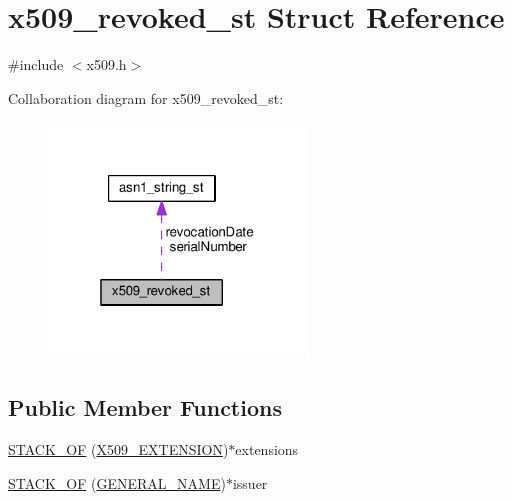 \hypertarget{structx509__revoked__st}{}\section{x509\+\_\+revoked\+\_\+st Struct Reference}
\label{structx509__revoked__st}


{\ttfamily \#include $<$x509.\+h$>$}



Collaboration diagram for x509\+\_\+revoked\+\_\+st\+:
\nopagebreak
\begin{figure}[H]
\begin{center}
\leavevmode
\includegraphics[width=196pt]{structx509__revoked__st__coll__graph}
\end{center}
\end{figure}
\subsection*{Public Member Functions}
\begin{DoxyCompactItemize}
\item 
\hyperlink{structx509__revoked__st_a7cda2324e28fdee169925d43cf9c4987}{S\+T\+A\+C\+K\+\_\+\+OF} (\hyperlink{x509_8h_ab2f7f7dc0ced8684e0cbfc818e408304}{X509\+\_\+\+E\+X\+T\+E\+N\+S\+I\+ON})$\ast$extensions
\item 
\hyperlink{structx509__revoked__st_a3bbf3ac238d169cff492184f23d0c182}{S\+T\+A\+C\+K\+\_\+\+OF} (\hyperlink{x509v3_8h_a6688fb8a0c7b8e63f3d47bac3a09eb15}{G\+E\+N\+E\+R\+A\+L\+\_\+\+N\+A\+ME})$\ast$issuer
\end{DoxyCompactItemize}
